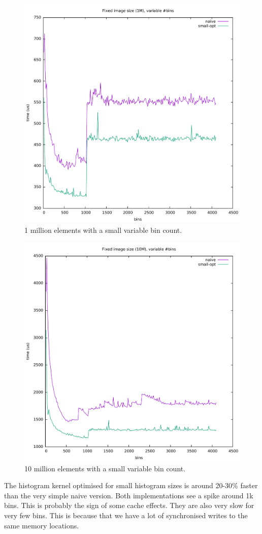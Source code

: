 \documentclass[12pt, a4paper, hidelinks]{article}
\begin{document}
\begin{figure}[htpb]
    \centering
    \includegraphics[width=0.6\linewidth]{img/graphs/1M-smallvarbins.pdf}
    \caption{1 million elements with a small variable bin count.}
    \label{fig:graph3}
\end{figure}
\begin{figure}[htpb]
    \centering
    \includegraphics[width=0.6\linewidth]{img/graphs/10M-smallvarbins.pdf}
    \caption{10 million elements with a small variable bin count.}
    \label{fig:graph4}
\end{figure}

The histogram kernel optimised for small histogram sizes is around
20-30\% faster than the very simple naive version.
Both implementations see a spike around 1k bins.
This is probably the sign of some cache effects.
They are also very slow for very few bins.
This is because that we have a lot of synchronised writes to the same memory locations.
\end{document}
